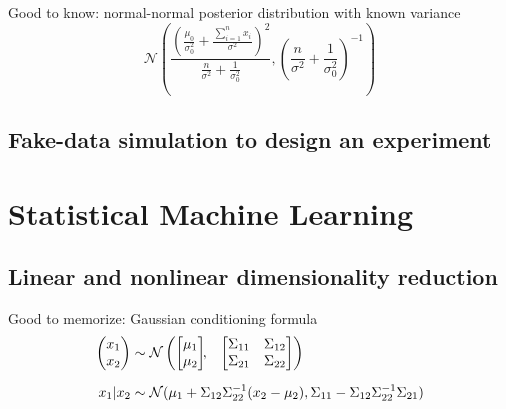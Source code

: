 \documentclass{article}
\begin{document}
Good to know: normal-normal posterior distribution with known variance
\[ \mathcal{N}\left(\frac{\left( \frac{\mu_0}{\sigma_0^2} + \frac{\sum_{i=1}^{n}x_i}{\sigma^2} \right)^2}{\frac{n}{\sigma^2} + \frac{1}{\sigma_0^2}}, \left(\frac{n}{\sigma^2} + \frac{1}{\sigma_0^2}\right)^{-1}\right)\]
\subsection{Fake-data simulation to design an experiment}

\section{Statistical Machine Learning}
\subsection{Linear and nonlinear dimensionality reduction}
Good to memorize: Gaussian conditioning formula
\begin{align*}
  \begin{pmatrix}x_{1}\\
    x_{2}
  \end{pmatrix} &\sim  \mathcal{N}
  \begin{pmatrix}
    \begin{bmatrix}
      \mu_1\\
      \mu_2
    \end{bmatrix}\!\!,&
    \begin{bmatrix}
      \Sigma_{11} & \Sigma_{12}\\
      \Sigma_{21} & \Sigma_{22}
    \end{bmatrix}
  \end{pmatrix}\\[2\jot]
  x_1 | x_2 &\sim \mathcal{N}(\mu_1 + \Sigma_{12}\Sigma_{22}^{-1}(x_2 - \mu_2), \Sigma_{11} - \Sigma_{12}\Sigma^{-1}_{22} \Sigma_{21})
\end{align*}
\end{document}
